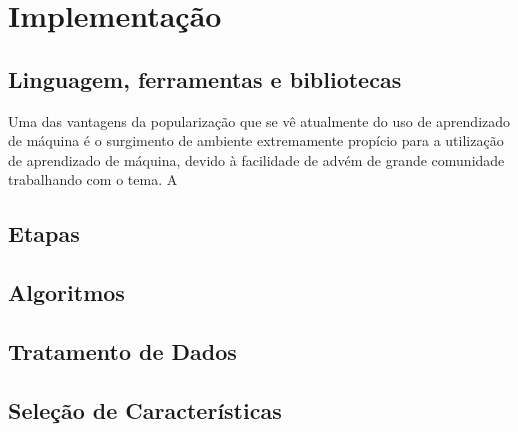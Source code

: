 
\section{Implementação}

\subsection{Linguagem, ferramentas e bibliotecas}

Uma das vantagens da popularização que se vê atualmente do uso de aprendizado de máquina é o surgimento de ambiente extremamente propício para a utilização de aprendizado de máquina, devido à facilidade de advém de grande comunidade trabalhando com o tema. A 

\subsection{Etapas}
\subsection{Algoritmos}
\subsection{Tratamento de Dados}
\subsection{Seleção de Características}
